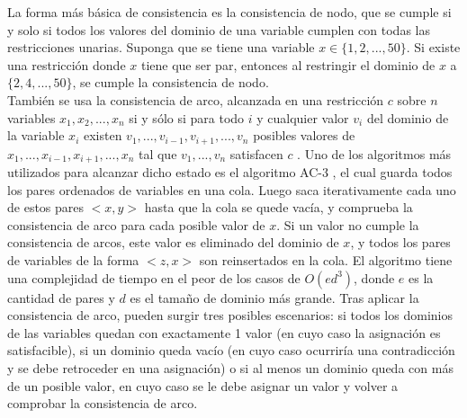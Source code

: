 \documentclass[12pt]{report}
\begin{document}
La forma más básica de consistencia es la consistencia de nodo, que se cumple si y solo si todos los valores del dominio de una variable cumplen con todas las restricciones unarias. Suponga que se tiene una variable $x \in \{1,2,...,50\}$. Si existe una restricción donde $x$ tiene que ser par, entonces al restringir el dominio de $x$ a $\{2,4,...,50\}$, se cumple la consistencia de nodo.\\

También se usa la consistencia de arco, alcanzada en una restricción $c$ sobre $n$ variables $x_1,x_2,...,x_n$ si y sólo si para todo $i$ y cualquier valor $v_i$ del dominio de la variable $x_i$ existen $v_1,...,v_{i-1},v_{i+1},...,v_n$ posibles valores de $x_1,...,x_{i-1},x_{i+1},...,x_n$ tal que $v_1,...,v_n$ satisfacen $c$ \cite{consistencia}. Uno de los algoritmos más utilizados para alcanzar dicho estado es el algoritmo AC-3 \cite{arco}, el cual guarda todos los pares ordenados de variables en una cola. Luego saca iterativamente cada uno de estos pares $<x,y>$ hasta que la cola se quede vacía, y comprueba la consistencia de arco para cada posible valor de $x$. Si un valor no cumple la consistencia de arcos, este valor es eliminado del dominio de $x$, y todos los pares de variables de la forma $<z,x>$ son reinsertados en la cola. El algoritmo tiene una complejidad de tiempo en el peor de los casos de $O(ed^3 )$, donde $e$ es la cantidad de pares y $d$ es el tamaño de dominio más grande. Tras aplicar la consistencia de arco, pueden surgir tres posibles escenarios: si todos los dominios de las variables quedan con exactamente 1 valor (en cuyo caso la asignación es satisfacible), si un dominio queda vacío (en cuyo caso ocurriría una contradicción y se debe retroceder en una asignación) o si al menos un dominio queda con más de un posible valor, en cuyo caso se le debe asignar un valor y volver a comprobar la consistencia de arco.\\
\end{document}
